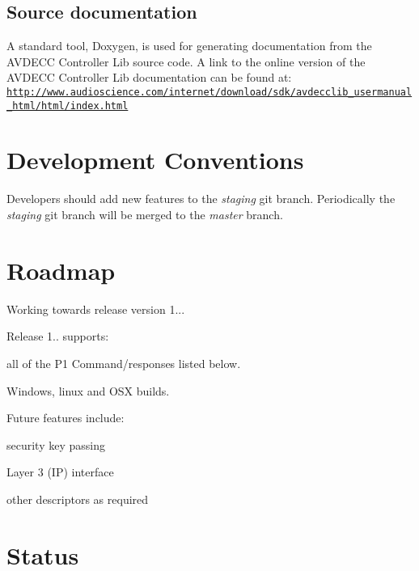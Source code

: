 \subsection*{Source documentation }

A standard tool, Doxygen, is used for generating documentation from the A\+V\+D\+E\+CC Controller Lib source code. A link to the online version of the A\+V\+D\+E\+CC Controller Lib documentation can be found at\+: \href{http://www.audioscience.com/internet/download/sdk/avdecclib_usermanual_html/html/index.html}{\tt http\+://www.\+audioscience.\+com/internet/download/sdk/avdecclib\+\_\+usermanual\+\_\+html/html/index.\+html}

\section*{Development Conventions }

Developers should add new features to the {\itshape staging} git branch. Periodically the {\itshape staging} git branch will be merged to the {\itshape master} branch.



\section*{Roadmap }

Working towards release version 1...

Release 1.. supports\+:
\begin{DoxyItemize}
\item all of the P1 Command/responses listed below.
\item Windows, linux and O\+SX builds.
\end{DoxyItemize}

Future features include\+:
\begin{DoxyItemize}
\item security key passing
\item Layer 3 (IP) interface
\item other descriptors as required
\end{DoxyItemize}

\section*{Status }

